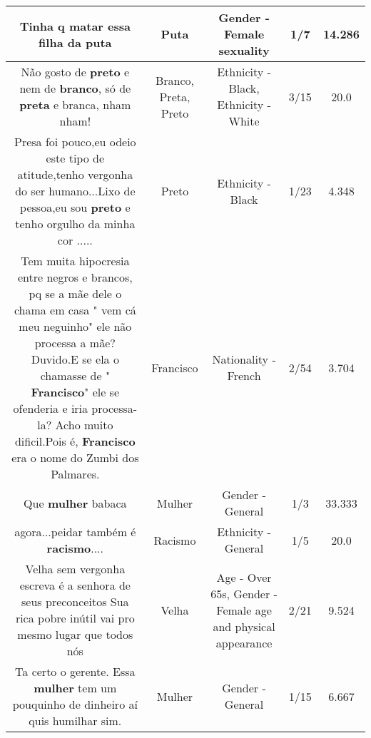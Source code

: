 \documentclass[11pt]{article}
\newlength\mylength
\begin{document}
\begin{center}
\begin{longtable}{|C{.65\mylength}|C{.30\mylength}|C{.12\mylength}|C{.12\mylength}|C{.12\mylength}|}
  \small Tinha q matar essa filha da puta\normalsize   & Puta & Gender - Female sexuality & 1/7 & 14.286 \\  \hline
  \small Não gosto de \textbf{preto} e nem de \textbf{branco}, só de \textbf{preta} e branca, nham nham!\normalsize   & Branco, Preta, Preto & Ethnicity - Black, Ethnicity - White & 3/15 & 20.0 \\  \hline
  \small Presa foi pouco,eu odeio este tipo de atitude,tenho vergonha do ser humano...Lixo de pessoa,eu sou \textbf{preto} e tenho orgulho da minha cor .....\normalsize   & Preto & Ethnicity - Black & 1/23 & 4.348 \\  \hline
  \small Tem muita hipocresia entre negros e brancos, pq se a mãe dele o chama em casa " vem cá meu neguinho" ele não processa a mãe? Duvido.E se ela o chamasse de " \textbf{Francisco}" ele se ofenderia e iria processa-la? Acho muito dificil.Pois é, \textbf{Francisco} era o nome do Zumbi dos Palmares.\normalsize   & Francisco & Nationality - French & 2/54 & 3.704 \\  \hline
  \small Que \textbf{mulher} babaca\normalsize   & Mulher & Gender - General & 1/3 & 33.333 \\  \hline
  \small agora...peidar também é  \textbf{racismo}....\normalsize   & Racismo & Ethnicity - General & 1/5 & 20.0 \\  \hline
  \small Velha sem vergonha escreva é a senhora de seus preconceitos Sua rica pobre inútil vai pro mesmo lugar que todos nós\normalsize   & Velha & Age - Over 65s, Gender - Female age and physical appearance & 2/21 & 9.524 \\  \hline
  \small Ta certo o gerente. Essa \textbf{mulher} tem um pouquinho de dinheiro aí quis humilhar sim.\normalsize   & Mulher & Gender - General & 1/15 & 6.667 \\  \hline

\end{longtable}
\end{center}
\end{document}
